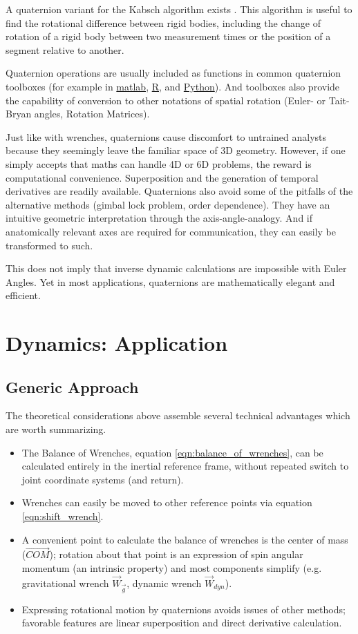 A quaternion variant for the Kabsch algorithm exists \citep{Kabsch1976,Lawrence2019,Kneller1991}.
This algorithm is useful to find the rotational difference between rigid bodies, including the change of rotation of a rigid body between two measurement times or the position of a segment relative to another.


Quaternion operations are usually included as functions in common quaternion toolboxes (for example in \href{https://www.mathworks.com/discovery/quaternion.html}{matlab}, \href{https://cran.r-project.org/web/packages/onion/onion.pdf}{R}, and \href{https://pypi.org/project/numpy-quaternion}{Python}).
And toolboxes also provide the capability of conversion to other notations of spatial rotation (Euler- or Tait-Bryan angles, Rotation Matrices).


Just like with wrenches, quaternions cause discomfort to untrained analysts because they seemingly leave the familiar space of 3D geometry.
However, if one simply accepts that maths can handle 4D or 6D problems, the reward is computational convenience.
Superposition and the generation of temporal derivatives are readily available.
Quaternions also avoid some of the pitfalls of the alternative methods (gimbal lock problem, order dependence).
They have an intuitive geometric interpretation through the axis-angle-analogy.
And if anatomically relevant axes are required for communication, they can easily be transformed to such.

This does not imply that inverse dynamic calculations are impossible with Euler Angles.
Yet in most applications, quaternions are mathematically elegant and efficient.

\FloatBarrier
\section{Dynamics: Application}
\label{sec:orge5b223f}

\subsection{Generic Approach}
\label{sec:orgf480667}
The theoretical considerations above assemble several technical advantages which are worth summarizing.
\begin{itemize}
\item The Balance of Wrenches, equation \eqref{eqn:balance_of_wrenches}, can be calculated entirely in the inertial reference frame, without repeated switch to joint coordinate systems (and return).
\item Wrenches can easily be moved to other reference points via equation \eqref{eqn:shift_wrench}.
\item A convenient point to calculate the balance of wrenches is the center of mass (\(\vec{COM}\)); rotation about that point is an expression of spin angular momentum (an intrinsic property) and most components simplify (e.g. gravitational wrench \(\vec{W}_{\vec{g}}\), dynamic wrench \(\vec{W}_{dyn}\)).
\item Expressing rotational motion by quaternions avoids issues of other methods; favorable features are linear superposition and direct derivative calculation.
\end{itemize}

